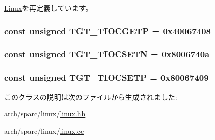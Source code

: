 \hyperlink{classLinux_a96e06e042526ea5e89c4e8a020636c52}{Linux}を再定義しています。\hypertarget{classSparcLinux_a90fcc56bd4aa74a5d86c87bfeae77625}{
\subsubsection[{TGT\_\-TIOCGETP}]{\setlength{\rightskip}{0pt plus 5cm}const unsigned {\bf TGT\_\-TIOCGETP} = 0x40067408}}
\label{classSparcLinux_a90fcc56bd4aa74a5d86c87bfeae77625}
\hypertarget{classSparcLinux_a6783bea53088dc89157c39a9a7c71988}{
\subsubsection[{TGT\_\-TIOCSETN}]{\setlength{\rightskip}{0pt plus 5cm}const unsigned {\bf TGT\_\-TIOCSETN} = 0x8006740a}}
\label{classSparcLinux_a6783bea53088dc89157c39a9a7c71988}
\hypertarget{classSparcLinux_a194059e48b091a80833c40b500e70bec}{
\subsubsection[{TGT\_\-TIOCSETP}]{\setlength{\rightskip}{0pt plus 5cm}const unsigned {\bf TGT\_\-TIOCSETP} = 0x80067409}}
\label{classSparcLinux_a194059e48b091a80833c40b500e70bec}


このクラスの説明は次のファイルから生成されました:\begin{DoxyCompactItemize}
\item 
arch/sparc/linux/\hyperlink{arch_2sparc_2linux_2linux_8hh}{linux.hh}\item 
arch/sparc/linux/\hyperlink{arch_2sparc_2linux_2linux_8cc}{linux.cc}\end{DoxyCompactItemize}

